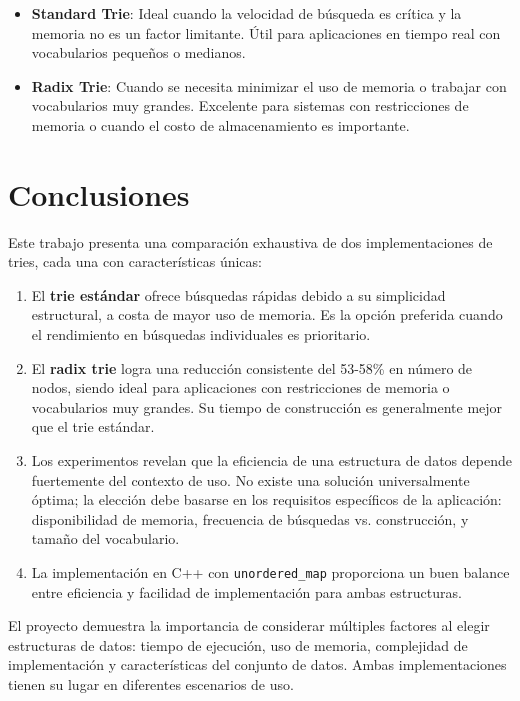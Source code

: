 \documentclass[11pt,a4paper]{article}
\begin{document}
\begin{itemize}
    \item \textbf{Standard Trie}: Ideal cuando la velocidad de búsqueda es crítica y la memoria no es un factor limitante. Útil para aplicaciones en tiempo real con vocabularios pequeños o medianos.
    
    \item \textbf{Radix Trie}: Cuando se necesita minimizar el uso de memoria o trabajar con vocabularios muy grandes. Excelente para sistemas con restricciones de memoria o cuando el costo de almacenamiento es importante.
\end{itemize}

\section{Conclusiones}

Este trabajo presenta una comparación exhaustiva de dos implementaciones de tries, cada una con características únicas:

\begin{enumerate}
    \item El \textbf{trie estándar} ofrece búsquedas rápidas debido a su simplicidad estructural, a costa de mayor uso de memoria. Es la opción preferida cuando el rendimiento en búsquedas individuales es prioritario.
    
    \item El \textbf{radix trie} logra una reducción consistente del 53-58\% en número de nodos, siendo ideal para aplicaciones con restricciones de memoria o vocabularios muy grandes. Su tiempo de construcción es generalmente mejor que el trie estándar.
    
    \item Los experimentos revelan que la eficiencia de una estructura de datos depende fuertemente del contexto de uso. No existe una solución universalmente óptima; la elección debe basarse en los requisitos específicos de la aplicación: disponibilidad de memoria, frecuencia de búsquedas vs. construcción, y tamaño del vocabulario.
    
    \item La implementación en C++ con \texttt{unordered\_map} proporciona un buen balance entre eficiencia y facilidad de implementación para ambas estructuras.
\end{enumerate}

El proyecto demuestra la importancia de considerar múltiples factores al elegir estructuras de datos: tiempo de ejecución, uso de memoria, complejidad de implementación y características del conjunto de datos. Ambas implementaciones tienen su lugar en diferentes escenarios de uso.
\end{document}
